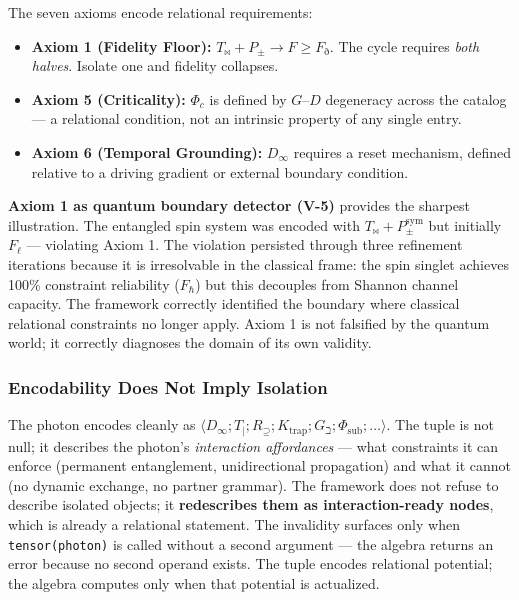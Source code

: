 \documentclass[12pt,a4paper]{article}
\begin{document}
The seven axioms encode relational requirements:

\begin{itemize}
    \item \textbf{Axiom 1 (Fidelity Floor):} $T_{\bowtie} + P_{\pm} \to F \geq F_{\eth}$. The cycle requires \emph{both halves}. Isolate one and fidelity collapses.
    \item \textbf{Axiom 5 (Criticality):} $\Phi_c$ is defined by $G$--$D$ degeneracy across the catalog --- a relational condition, not an intrinsic property of any single entry.
    \item \textbf{Axiom 6 (Temporal Grounding):} $D_{\infty}$ requires a reset mechanism, defined relative to a driving gradient or external boundary condition.
\end{itemize}

\textbf{Axiom 1 as quantum boundary detector (V-5)} provides the sharpest illustration. The entangled spin system was encoded with $T_{\bowtie} + P_{\pm}^{\text{sym}}$ but initially $F_\ell$ --- violating Axiom 1. The violation persisted through three refinement iterations because it is irresolvable in the classical frame: the spin singlet achieves 100\% constraint reliability ($F_\hbar$) but this decouples from Shannon channel capacity. The framework correctly identified the boundary where classical relational constraints no longer apply. Axiom 1 is not falsified by the quantum world; it correctly diagnoses the domain of its own validity.

\subsubsection{Encodability Does Not Imply Isolation}

The photon encodes cleanly as $\langle D_{\infty}; T_{|}; R_{\supseteq}; K_\text{trap}; G_{\beth}; \Phi_\text{sub}; \ldots \rangle$. The tuple is not null; it describes the photon's \emph{interaction affordances} --- what constraints it can enforce (permanent entanglement, unidirectional propagation) and what it cannot (no dynamic exchange, no partner grammar). The framework does not refuse to describe isolated objects; it \textbf{redescribes them as interaction-ready nodes}, which is already a relational statement. The invalidity surfaces only when \texttt{tensor(photon)} is called without a second argument --- the algebra returns an error because no second operand exists. The tuple encodes relational potential; the algebra computes only when that potential is actualized.
\end{document}
